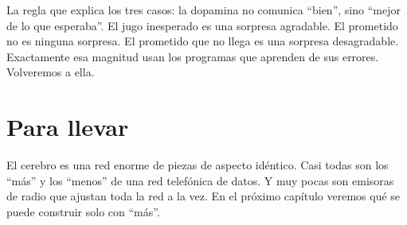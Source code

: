 La regla que explica los tres casos: la dopamina no comunica “bien”, sino “mejor de lo que esperaba”. El jugo inesperado es una sorpresa agradable. El prometido no es ninguna sorpresa. El prometido que no llega es una sorpresa desagradable. Exactamente esa magnitud usan los programas que aprenden de sus errores. Volveremos a ella.

\section*{Para llevar}

El cerebro es una red enorme de piezas de aspecto idéntico. Casi todas son los “más” y los “menos” de una red telefónica de datos. Y muy pocas son emisoras de radio que ajustan toda la red a la vez. En el próximo capítulo veremos qué se puede construir solo con “más”.

